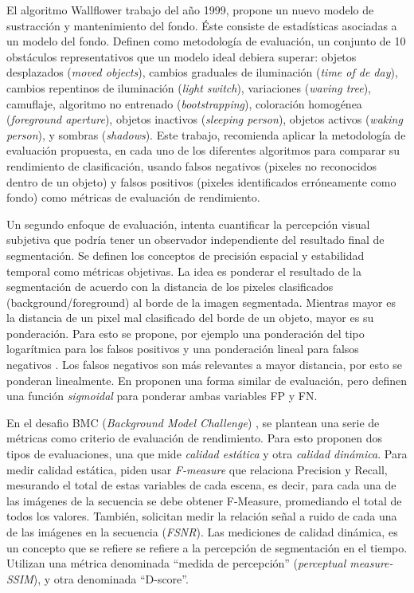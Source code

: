 \indent El algoritmo Wallflower\cite{toyama_wallflower_1999} trabajo del año 1999, propone un nuevo modelo de sustracción y mantenimiento del fondo. Éste consiste de estadísticas asociadas a un modelo del fondo. Definen como metodología de evaluación, un conjunto de 10 obstáculos representativos que un modelo ideal debiera superar: objetos desplazados (\textit{moved objects}), cambios graduales de iluminación (\textit{time of de day}), cambios repentinos de iluminación (\textit{light switch}), variaciones (\textit{waving tree}), camuflaje, algoritmo no entrenado (\textit{bootstrapping}), coloración homogénea (\textit{foreground aperture}), objetos inactivos (\textit{sleeping person}), objetos activos (\textit{waking person}), y sombras (\textit{shadows}). Este trabajo, recomienda aplicar la metodología de evaluación propuesta, en cada uno de los diferentes algoritmos para comparar su rendimiento de clasificación, usando falsos negativos (pixeles no reconocidos dentro de un objeto) y falsos positivos (pixeles identificados erróneamente como fondo) como métricas de evaluación de rendimiento.

\indent Un segundo enfoque de evaluación, intenta cuantificar la percepción visual subjetiva que podría tener un observador independiente del resultado final de segmentación. Se definen los conceptos de precisión espacial y estabilidad temporal \cite{cavallaro_objective_2002} \cite{villegas_perceptually-weighted_2004} como métricas objetivas. La idea es ponderar el resultado de la segmentación de acuerdo con la distancia de los pixeles clasificados (background/foreground) al borde de la imagen segmentada. Mientras mayor es la distancia de un pixel mal clasificado del borde de un objeto, mayor es su ponderación. Para esto se propone, por ejemplo una ponderación del tipo logarítmica para los falsos positivos y una ponderación lineal para falsos negativos \cite{cavallaro_objective_2002} \cite{villegas_perceptually-weighted_2004}. Los falsos negativos son más relevantes a mayor distancia, por esto se ponderan linealmente. En \cite{liu_metrics_2011} proponen una forma similar de evaluación, pero definen una función \emph{sigmoidal} para ponderar ambas variables FP y FN.

\indent En el desafio BMC (\textit{Background Model Challenge}) \cite{park_benchmark_2013}, se plantean una serie de métricas como criterio de evaluación de rendimiento. Para esto  proponen dos tipos de evaluaciones, una que mide \emph{calidad estática} y otra \emph{calidad dinámica}. Para medir calidad estática, piden usar \emph{F-measure} que relaciona Precision y Recall, mesurando el total de estas variables de cada escena, es decir, para cada una de las imágenes de la secuencia se debe obtener F-Measure, promediando el total de todos los valores. También, solicitan medir la relación señal a ruido de cada una de las imágenes en la secuencia (\textit{FSNR}). Las mediciones de calidad dinámica, es un concepto que se refiere se refiere a la percepción de segmentación en el tiempo. Utilizan una métrica denominada ``medida de percepción'' (\textit{perceptual measure-SSIM}), y otra denominada ``D-score''\cite{lallier_testing_2011}.


